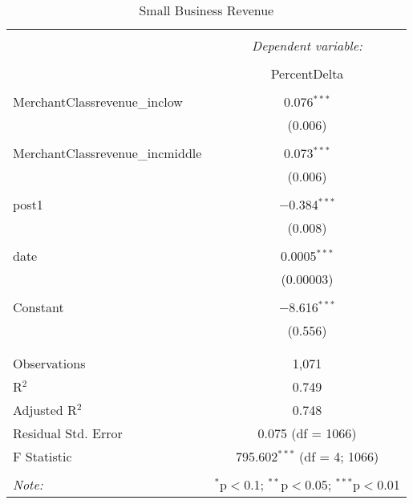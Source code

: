 
\begin{table}[!htbp] \centering 
  \caption{Small Business Revenue} 
  \label{} 
\begin{tabular}{@{\extracolsep{5pt}}lc} 
\\[-1.8ex]\hline 
\hline \\[-1.8ex] 
 & \multicolumn{1}{c}{\textit{Dependent variable:}} \\ 
\cline{2-2} 
\\[-1.8ex] & PercentDelta \\ 
\hline \\[-1.8ex] 
 MerchantClassrevenue\_inclow & 0.076$^{***}$ \\ 
  & (0.006) \\ 
  & \\ 
 MerchantClassrevenue\_incmiddle & 0.073$^{***}$ \\ 
  & (0.006) \\ 
  & \\ 
 post1 & $-$0.384$^{***}$ \\ 
  & (0.008) \\ 
  & \\ 
 date & 0.0005$^{***}$ \\ 
  & (0.00003) \\ 
  & \\ 
 Constant & $-$8.616$^{***}$ \\ 
  & (0.556) \\ 
  & \\ 
\hline \\[-1.8ex] 
Observations & 1,071 \\ 
R$^{2}$ & 0.749 \\ 
Adjusted R$^{2}$ & 0.748 \\ 
Residual Std. Error & 0.075 (df = 1066) \\ 
F Statistic & 795.602$^{***}$ (df = 4; 1066) \\ 
\hline 
\hline \\[-1.8ex] 
\textit{Note:}  & \multicolumn{1}{r}{$^{*}$p$<$0.1; $^{**}$p$<$0.05; $^{***}$p$<$0.01} \\ 
\end{tabular} 
\end{table} 
